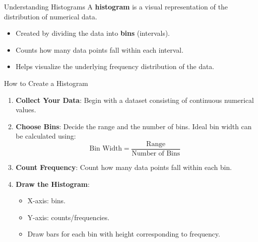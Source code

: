 \documentclass[aspectratio=169]{beamer}
\begin{document}
\begin{frame}[fragile]{Understanding Histograms}
  A \textbf{histogram} is a visual representation of the distribution of numerical data. 
  \begin{itemize}
    \item Created by dividing the data into \textbf{bins} (intervals).
    \item Counts how many data points fall within each interval.
    \item Helps visualize the underlying frequency distribution of the data.
  \end{itemize}
\end{frame}

\begin{frame}[fragile]{How to Create a Histogram}
  \begin{enumerate}
    \item \textbf{Collect Your Data}: Begin with a dataset consisting of continuous numerical values.
    \item \textbf{Choose Bins}: Decide the range and the number of bins. Ideal bin width can be calculated using:
      \begin{equation}
        \text{Bin Width} = \frac{\text{Range}}{\text{Number of Bins}}
      \end{equation}
    \item \textbf{Count Frequency}: Count how many data points fall within each bin.
    \item \textbf{Draw the Histogram}:
      \begin{itemize}
        \item X-axis: bins.
        \item Y-axis: counts/frequencies.
        \item Draw bars for each bin with height corresponding to frequency.
      \end{itemize}
  \end{enumerate}
\end{frame}
\end{document}
